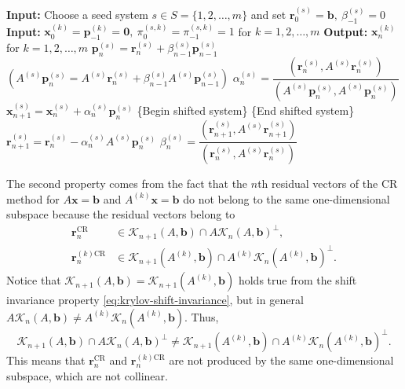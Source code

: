 \begin{algorithm}[H]\caption{{The shifted CR method}}\label{alg:shifted-cr}\begin{algorithmic}[1]
\Statex\textbf{Input:} {Choose a seed system $s\in S=\{1,2,\ldots,m\}$ and set $\bm r_0^{(s)}=\bm b,\ \beta_{-1}^{(s)}=0$}
\Statex\textbf{Input:} $\bm x_0^{(k)}=\bm p_{-1}^{(k)}=\bm0,\ \pi_0^{(s,k)}=\pi_{-1}^{(s,k)}=1$ {for} $k=1,2,\ldots,m$
\Statex\textbf{Output:} $\bm x_n^{(k)}$ {for} $k=1,2,\ldots,m$
\State $\bm p_n^{(s)}=\bm r_n^{(s)}+\beta_{n-1}^{(s)}\bm p_{n-1}^{(s)}$
\State $(A^{(s)}\bm p_n^{(s)}=A^{(s)}\bm r_n^{(s)}+\beta_{n-1}^{(s)}A^{(s)}\bm p_{n-1}^{(s)})$
\State $\alpha_n^{(s)}=\dfrac{(\bm r_n^{(s)},A^{(s)}\bm r_n^{(s)})}{(A^{(s)}\bm p_n^{(s)},A^{(s)}\bm p_n^{(s)})}$
\State $\bm x_{n+1}^{(s)}=\bm x_n^{(s)}+\alpha_n^{(s)}\bm p_n^{(s)}$
\State \{{Begin shifted system}\}
\State \{{End shifted system}\}
\State $\bm r_{n+1}^{(s)}=\bm r_n^{(s)}-\alpha_n^{(s)}A^{(s)}\bm p_n^{(s)}$
\State $\beta_n^{(s)}=\dfrac{(\bm r_{n+1}^{(s)},A^{(s)}\bm r_{n+1}^{(s)})}{(\bm r_n^{(s)},A^{(s)}\bm r_n^{(s)})}$
\EndFor\end{algorithmic}\end{algorithm}
{The second property comes from the fact that the $n$th residual vectors of the CR method for $A\bm x=\bm b$ and $A^{(k)}\bm x=\bm b$ do not belong to the same one-dimensional subspace because the residual vectors belong to}
\[\begin{aligned}\bm r_n^{\mathrm{CR}}&\in\mathcal K_{n+1}(A,\bm b)\cap A\mathcal K_n(A,\bm b)^{\perp},\\\bm r_n^{(k)\mathrm{CR}}&\in\mathcal K_{n+1}(A^{(k)},\bm b)\cap A^{(k)}\mathcal K_n(A^{(k)},\bm b)^{\perp}.\end{aligned}\]
{Notice that $\mathcal K_{n+1}(A,\bm b)=\mathcal K_{n+1}(A^{(k)},\bm b)$ holds true from the shift invariance property \eqref{eq:krylov-shift-invariance}, but in general $A\mathcal K_n(A,\bm b)\ne A^{(k)}\mathcal K_n(A^{(k)},\bm b)$. Thus,}
\[\mathcal K_{n+1}(A,\bm b)\cap A\mathcal K_n(A,\bm b)^{\perp}\ne\mathcal K_{n+1}(A^{(k)},\bm b)\cap A^{(k)}\mathcal K_n(A^{(k)},\bm b)^{\perp}.\]
{This means that $\bm r_n^{\mathrm{CR}}$ and $\bm r_n^{(k)\mathrm{CR}}$ are not produced by the same one-dimensional subspace, which are not collinear.}
